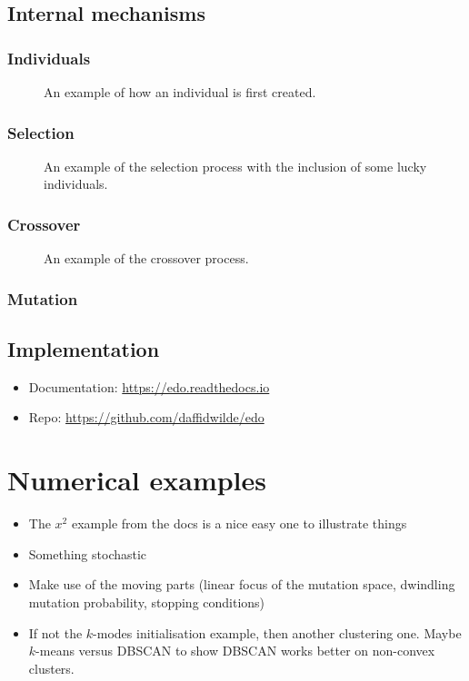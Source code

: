 \documentclass[10pt]{article}
\newlength{\imgwidth}
\newcommand{\inputtikz}[3][\imgwidth]{%
    \begin{figure}[htbp]
        \centering
        \resizebox{#1}{!}{%
            
        }
        \caption{#3}
    \end{figure}
}
\begin{document}
\subsection{Internal mechanisms}\label{subsection:mechanisms}

\subsubsection{Individuals}

\inputtikz{tex/individual.tex}{%
    An example of how an individual is first created.
}

\subsubsection{Selection}

\inputtikz{tex/selection.tex}{%
    An example of the selection process with the inclusion of some lucky
    individuals.
}

\subsubsection{Crossover}

\inputtikz{tex/crossover.tex}{An example of the crossover process.}

\subsubsection{Mutation}

\subsection{Implementation}\label{subsection:implementation}

\begin{itemize}
    \item Documentation: \url{https://edo.readthedocs.io}
    \item Repo: \url{https://github.com/daffidwilde/edo}
\end{itemize}


\section{Numerical examples}\label{section:examples}

\begin{itemize}
    \item The \(x^2\) example from the docs is a nice easy one to illustrate
        things
    \item Something stochastic
    \item Make use of the moving parts (linear focus of the mutation space,
        dwindling mutation probability, stopping conditions)
    \item If not the \(k\)-modes initialisation example, then another clustering
        one. Maybe \(k\)-means versus DBSCAN to show DBSCAN works better on
        non-convex clusters.
\end{itemize}
\end{document}
